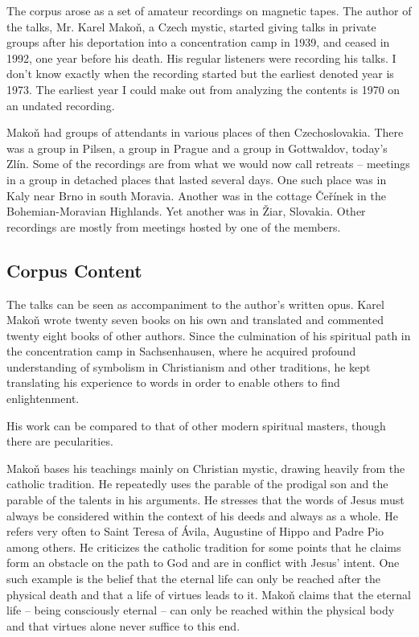 \documentclass[conference]{IEEEtran}
\begin{document}
The corpus arose as a set of amateur recordings on magnetic tapes. The author of
the talks, Mr. Karel Makoň\cite{hajek2007cesky}, a Czech mystic, started giving talks in private
groups after his deportation into a concentration camp in 1939, and ceased in
1992, one year before his death. His regular listeners were recording his
talks. I don't know exactly when the recording started but the earliest denoted
year is 1973. The earliest year I could make out from analyzing the contents is
1970 on an undated recording.

Makoň had groups of attendants in various places of then Czechoslovakia. There
was a group in Pilsen, a group in Prague and a group in Gottwaldov, today's
Zlín. Some of the recordings are from what we would now call retreats -- meetings
in a group in detached places that lasted several days. One such place was in
Kaly near Brno in south Moravia. Another was in the cottage Čeřínek in the
Bohemian-Moravian Highlands. Yet another was in Žiar, Slovakia. Other recordings are mostly from meetings hosted by one of
the members.

\subsection{Corpus Content}

The talks can be seen as accompaniment to the author's written opus. Karel Makoň
wrote twenty seven books on his own and translated and commented twenty eight
books of other authors. Since the culmination of his spiritual path in the
concentration camp in Sachsenhausen, where he acquired profound understanding of
symbolism in Christianism and other traditions, he kept translating his
experience to words in order to enable others to find enlightenment.

His work can be compared to that of other modern spiritual masters, though there
are pecularities.

Makoň bases his teachings mainly on Christian mystic, drawing
heavily from the catholic tradition. He repeatedly uses the parable of the
prodigal son and the parable of the talents in his arguments. He stresses that
the words of Jesus must always be considered within the context of his deeds and
always as a whole. He refers very often to Saint Teresa of
Ávila, Augustine of Hippo and Padre Pio among others. He criticizes the catholic
tradition for some points that he claims form an obstacle on the path to God and
are in conflict with Jesus' intent. One such example is the belief that the
eternal life can only be reached after the physical death and that a life of
virtues leads to it. Makoň claims that the eternal life -- being consciously
eternal -- can only be reached within the physical body and that virtues alone
never suffice to this end.
\end{document}

